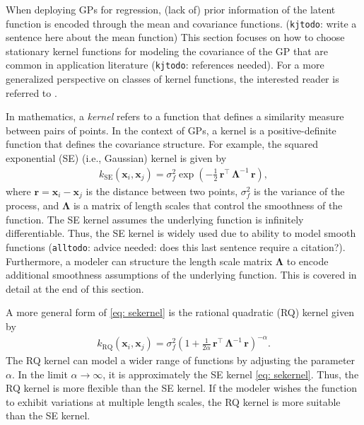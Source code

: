 \documentclass[journal=jacsat,manuscript=article]{achemso}
\newcommand{\kjtodo}[1]{{\color{Red} (\texttt{kjtodo}: #1)}}
\newcommand{\alltodo}[1]{{\color{Cyan} (\texttt{alltodo}: #1)}}
\newcommand{\xvec}{\ensuremath{\mathbf{x}}}
\begin{document}
When deploying GPs for regression, (lack of) prior information of the latent function is encoded through the mean and covariance functions. \kjtodo{write a sentence here about the mean function} This section focuses on how to choose stationary kernel functions for modeling the covariance of the GP that are common in application literature \kjtodo{references needed}. For a more generalized perspective on classes of kernel functions, the interested reader is referred to \citeauthor{Genton} \cite{Genton}.

In mathematics, a \textit{kernel} refers to a function that defines a similarity measure between pairs of points. In the context of GPs, a kernel is a positive-definite function that defines the covariance structure. For example, the squared exponential (SE) (i.e., Gaussian) kernel is given by
\begin{gather}
    k_{\text{SE}}(\xvec_i,\xvec_j) = \sigma_f^2 \exp \left(-\frac{1}{2}\, \mathbf{r}^\intercal \,\boldsymbol{\Lambda}^{-1} \,\mathbf{r} \right), \label{eq: sekernel}
\end{gather}
where $\mathbf{r} = \xvec_i - \xvec_j$ is the distance between two points, $\sigma_f^2$ is the variance of the process, and $\boldsymbol{\Lambda}$ is a matrix of length scales that control the smoothness of the function. The SE kernel assumes the underlying function is infinitely differentiable. Thus, the SE kernel is widely used due to ability to model smooth functions \alltodo{advice needed: does this last sentence require a citation?}. Furthermore, a modeler can structure the length scale matrix $\boldsymbol{\Lambda}$ to encode additional smoothness assumptions of the underlying function. This is covered in detail at the end of this section. 

A more general form of \eqref{eq: sekernel} is the rational quadratic (RQ) kernel given by
\begin{gather}
    k_{\text{RQ}}(\xvec_i,\xvec_j) = \sigma_f^2 \left(1 +\frac{1}{2 \alpha} \,\mathbf{r}^\intercal \,\boldsymbol{\Lambda}^{-1} \,\mathbf{r} \right)^{-\alpha}. \label{eq: rationalquadkernel}
\end{gather}
The RQ kernel can model a wider range of functions by adjusting the parameter $\alpha$. In the limit $\alpha \rightarrow \infty$, it is approximately the SE kernel \eqref{eq: sekernel}. Thus, the RQ kernel is more flexible than the SE kernel. If the modeler wishes the function to exhibit variations at multiple length scales, the RQ kernel is more suitable than the SE kernel.
\end{document}
